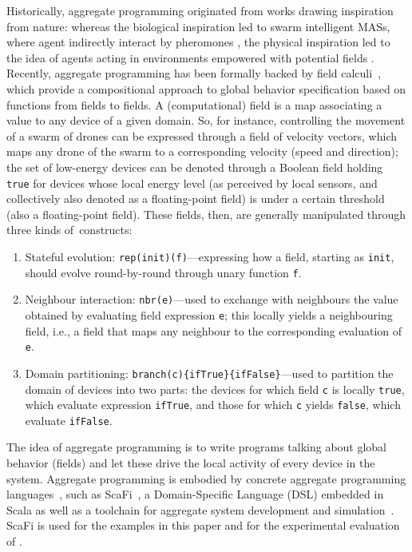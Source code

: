 \documentclass[jsan,article,accept,moreauthors,pdftex]{Definitions/mdpi}
\begin{document}
Historically, aggregate programming originated from works drawing inspiration from nature: whereas the biological inspiration led to swarm intelligent MASs, where agent indirectly interact by pheromones \cite{DBLP:conf/atal/ParunakBS02}, the physical inspiration led to the idea of agents acting in environments empowered with potential fields \cite{DBLP:books/daglib/0015276}.
%
Recently, aggregate programming has been formally backed by 
 {field calculi}~\cite{viroli2019jlamp-si-coord},
 which provide a compositional approach
 to global behavior specification
 based on functions from fields to fields.
%
A {(computational) field} is a map associating a value to any device of a given domain.
%
So, for instance, controlling the movement of a swarm of drones
 can be expressed through a field of velocity vectors,
 which maps any drone of the swarm to a corresponding 
 velocity (speed and direction);
 the set of low-energy devices can be denoted through a Boolean
  field holding \texttt{true} for devices whose local energy level (as perceived by local sensors, and collectively also denoted as a floating-point field)
  is under a certain threshold (also a floating-point field).
%
These fields, then, are generally manipulated through 
 three kinds \mbox{of constructs}:
\begin{enumerate}
\item {Stateful evolution}: \lstinline|rep(init)(f)|---expressing %
 how a field, starting as \lstinline|init|, should evolve round-by-round through unary function \lstinline|f|.
\item {Neighbour interaction}: \lstinline|nbr(e)|---used to exchange with neighbours the value obtained by evaluating field expression \lstinline|e|; this locally yields a {neighbouring field}, i.e., a field that maps any neighbour to the corresponding evaluation of \lstinline|e|.
\item {Domain partitioning}: \lstinline|branch(c){ifTrue}{ifFalse}|---used to partition the domain of devices into two parts: the devices for which field \lstinline|c| is locally \lstinline|true|, which evaluate expression \lstinline|ifTrue|, and those for which \lstinline|c| yields \lstinline|false|, which evaluate \lstinline|ifFalse|. 
\end{enumerate}
%
The idea of aggregate programming is to 
 write programs talking about global behavior (fields)
 and let these drive the local activity of every device in the system.
%
Aggregate programming is embodied by concrete aggregate programming languages~\cite{viroli2019jlamp-si-coord},
 such as ScaFi~\cite{DBLP:conf/isola/CasadeiVAD20,DBLP:journals/eaai/CasadeiVAPD21},
 a Domain-Specific Language (DSL) embedded in Scala
 as well as a toolchain for aggregate system development and simulation~\cite{Casadei2016mass}.
%
ScaFi is used for the examples in this paper and for the experimental evaluation of .
\end{document}
